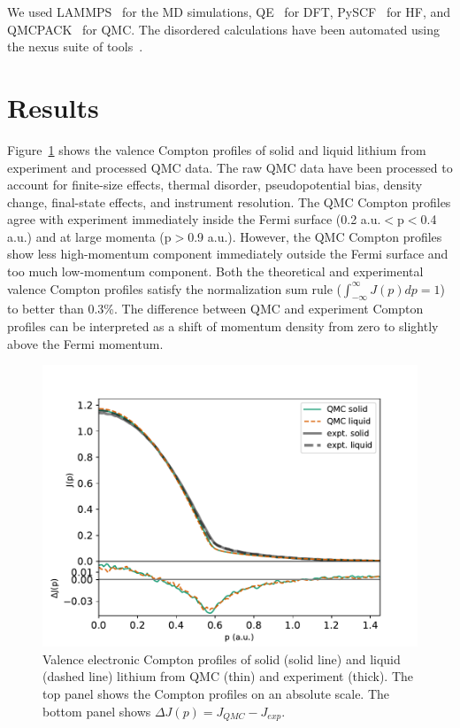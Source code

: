 \documentclass[aps,prb,showpacs,preprintnumbers,amsmath,amssymb,superscriptaddress,twocolumn]{revtex4-1}
\begin{document}
We used LAMMPS~\cite{Plimpton1995} for the MD simulations, QE~\cite{Giannozzi2009,Giannozzi2017} for DFT, PySCF~\cite{PYSCF} for HF, and QMCPACK~\cite{Kim2018} for QMC. The disordered calculations have been automated using the nexus suite of tools~\cite{Krogel2016}.

\section{Results} \label{sec:results}

Figure~\ref{fig:sl-jp-djp} shows the valence Compton profiles of solid and liquid lithium from experiment and processed QMC data. The raw QMC data have been processed to account for finite-size effects, thermal disorder, pseudopotential bias, density change, final-state effects, and instrument resolution. The QMC Compton profiles agree with experiment immediately inside the Fermi surface (0.2 a.u.$<$p$<$0.4 a.u.) and at large momenta (p$>$0.9  a.u.). However, the QMC Compton profiles show less high-momentum component immediately outside the Fermi surface and too much low-momentum component. Both the theoretical and experimental valence Compton profiles satisfy the normalization sum rule ($\int_{-\infty}^{\infty} J(p)dp=1$) to better than 0.3\%. The difference between QMC and experiment Compton profiles can be interpreted as a shift of momentum density from zero to slightly above the Fermi momentum. 

\begin{figure}[h]
\includegraphics[width=\linewidth]{li58_sl-jp}
\caption{Valence electronic Compton profiles of solid (solid line) and liquid (dashed line) lithium from QMC (thin) and experiment (thick). The top panel shows the Compton profiles on an absolute scale. The bottom panel shows  $\Delta J(p)=J_{QMC}-J_{exp}$.}%
\label{fig:sl-jp-djp}
\end{figure}
\end{document}
